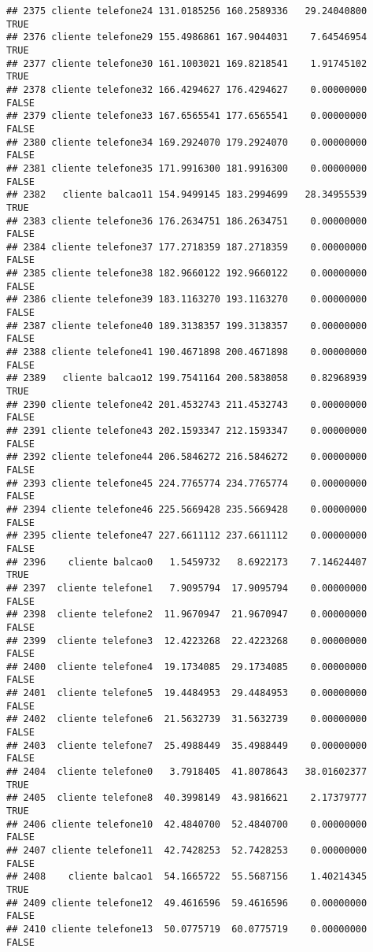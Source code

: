 \documentclass[
]{article}
\begin{document}
\begin{verbatim}
## 2375 cliente telefone24 131.0185256 160.2589336   29.24040800     TRUE
## 2376 cliente telefone29 155.4986861 167.9044031    7.64546954     TRUE
## 2377 cliente telefone30 161.1003021 169.8218541    1.91745102     TRUE
## 2378 cliente telefone32 166.4294627 176.4294627    0.00000000    FALSE
## 2379 cliente telefone33 167.6565541 177.6565541    0.00000000    FALSE
## 2380 cliente telefone34 169.2924070 179.2924070    0.00000000    FALSE
## 2381 cliente telefone35 171.9916300 181.9916300    0.00000000    FALSE
## 2382   cliente balcao11 154.9499145 183.2994699   28.34955539     TRUE
## 2383 cliente telefone36 176.2634751 186.2634751    0.00000000    FALSE
## 2384 cliente telefone37 177.2718359 187.2718359    0.00000000    FALSE
## 2385 cliente telefone38 182.9660122 192.9660122    0.00000000    FALSE
## 2386 cliente telefone39 183.1163270 193.1163270    0.00000000    FALSE
## 2387 cliente telefone40 189.3138357 199.3138357    0.00000000    FALSE
## 2388 cliente telefone41 190.4671898 200.4671898    0.00000000    FALSE
## 2389   cliente balcao12 199.7541164 200.5838058    0.82968939     TRUE
## 2390 cliente telefone42 201.4532743 211.4532743    0.00000000    FALSE
## 2391 cliente telefone43 202.1593347 212.1593347    0.00000000    FALSE
## 2392 cliente telefone44 206.5846272 216.5846272    0.00000000    FALSE
## 2393 cliente telefone45 224.7765774 234.7765774    0.00000000    FALSE
## 2394 cliente telefone46 225.5669428 235.5669428    0.00000000    FALSE
## 2395 cliente telefone47 227.6611112 237.6611112    0.00000000    FALSE
## 2396    cliente balcao0   1.5459732   8.6922173    7.14624407     TRUE
## 2397  cliente telefone1   7.9095794  17.9095794    0.00000000    FALSE
## 2398  cliente telefone2  11.9670947  21.9670947    0.00000000    FALSE
## 2399  cliente telefone3  12.4223268  22.4223268    0.00000000    FALSE
## 2400  cliente telefone4  19.1734085  29.1734085    0.00000000    FALSE
## 2401  cliente telefone5  19.4484953  29.4484953    0.00000000    FALSE
## 2402  cliente telefone6  21.5632739  31.5632739    0.00000000    FALSE
## 2403  cliente telefone7  25.4988449  35.4988449    0.00000000    FALSE
## 2404  cliente telefone0   3.7918405  41.8078643   38.01602377     TRUE
## 2405  cliente telefone8  40.3998149  43.9816621    2.17379777     TRUE
## 2406 cliente telefone10  42.4840700  52.4840700    0.00000000    FALSE
## 2407 cliente telefone11  42.7428253  52.7428253    0.00000000    FALSE
## 2408    cliente balcao1  54.1665722  55.5687156    1.40214345     TRUE
## 2409 cliente telefone12  49.4616596  59.4616596    0.00000000    FALSE
## 2410 cliente telefone13  50.0775719  60.0775719    0.00000000    FALSE

\end{verbatim}
\end{document}
